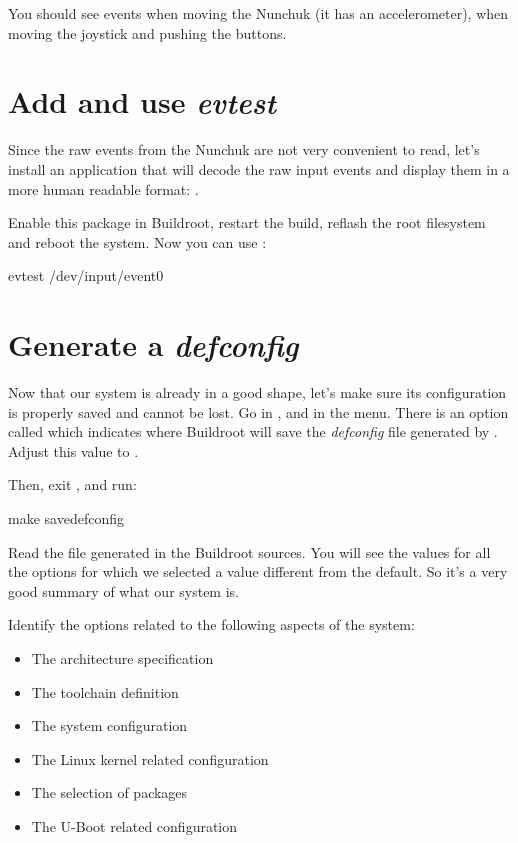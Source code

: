 You should see events when moving the Nunchuk (it has an
accelerometer), when moving the joystick and pushing the buttons.

\section{Add and use {\em evtest}}

Since the raw events from the Nunchuk are not very convenient to read,
let's install an application that will decode the raw input events
and display them in a more human readable format: .

Enable this package in Buildroot, restart the build, reflash the root
filesystem and reboot the system. Now you can use :

\begin{bashinput}
evtest /dev/input/event0
\end{bashinput}

\section{Generate a {\em defconfig}}

Now that our system is already in a good shape, let's make sure its
configuration is properly saved and cannot be lost. Go in
, and in the  menu. There is an
option called  which indicates
where Buildroot will save the {\em defconfig} file generated by
. Adjust this value to
.

Then, exit , and run:

\begin{bashinput}
make savedefconfig
\end{bashinput}

Read the file  generated in the
Buildroot sources. You will see the values for all the options for
which we selected a value different from the default. So it's a very
good summary of what our system is.

Identify the options related to the following aspects of the system:

\begin{itemize}
\item The architecture specification
\item The toolchain definition
\item The system configuration
\item The Linux kernel related configuration
\item The selection of packages
\item The U-Boot related configuration
\end{itemize}

